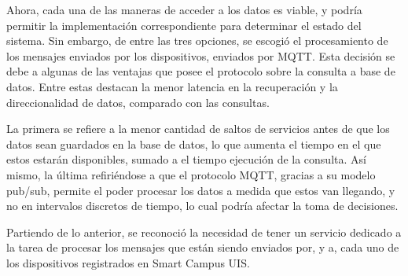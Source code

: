 Ahora, cada una de las maneras de acceder a los datos es viable, y podría permitir la implementación correspondiente para determinar el estado del sistema. Sin embargo, de entre las tres opciones, se escogió el procesamiento de los mensajes enviados por los dispositivos, enviados por MQTT. Esta decisión se debe a algunas de las ventajas que posee el protocolo sobre la consulta a base de datos. Entre estas destacan la menor latencia en la recuperación y la direccionalidad de datos, comparado con las consultas. 

La primera se refiere a la menor cantidad de saltos de servicios antes de que los datos sean guardados en la base de datos, lo que aumenta el tiempo en el que estos estarán disponibles, sumado a el tiempo ejecución de la consulta. Así mismo, la última refiriéndose a que el protocolo MQTT, gracias a su modelo pub/sub, permite el poder procesar los datos a medida que estos van llegando, y no en intervalos discretos de tiempo, lo cual podría afectar la toma de decisiones.

Partiendo de lo anterior, se reconoció la necesidad de tener un servicio dedicado a la tarea de procesar los mensajes que están siendo enviados por, y a, cada uno de los dispositivos registrados en Smart Campus UIS. 
